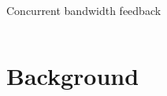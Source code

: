 \documentclass[10pt]{beamer}
\begin{document}
\begin{frame}[fragile]{Concurrent bandwidth feedback}
\begin{columns}[T]
\begin{column}{\textwidth}
    \end{column}
  \end{columns}
\end{frame}

\section{Background}
\end{document}
